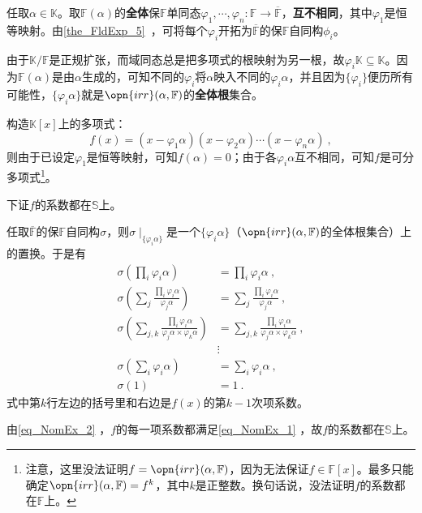 任取$\alpha\in\mathbb{K}$。取$\mathbb{F}(\alpha)$的\textbf{全体}保$\mathbb{F}$单同态$\varphi_1, \cdots, \varphi_n:\mathbb{F}\to\overline{\mathbb{F}}$，\textbf{互不相同}，其中$\varphi_1$是恒等映射。由\autoref{the_FldExp_5}~，可将每个$\varphi_i$开拓为$\overline{\mathbb{F}}$的保$\mathbb{F}$自同构$\phi_i$。

由于$\mathbb{K}/\mathbb{F}$是正规扩张，而域同态总是把多项式的根映射为另一根，故$\varphi_i\mathbb{K}\subseteq\mathbb{K}$。因为$\mathbb{F}(\alpha)$是由$\alpha$生成的，可知不同的$\varphi_i$将$\alpha$映入不同的$\varphi_i\alpha$，并且因为$\{\varphi_i\}$便历所有可能性，$\{\varphi_i\alpha\}$就是$\opn{irr}(\alpha, \mathbb{F})$的\textbf{全体根}集合。

构造$\mathbb{K}[x]$上的多项式：
\begin{equation}
f(x) = (x-\varphi_1\alpha)(x-\varphi_2\alpha)\cdots(x-\varphi_n\alpha)~,
\end{equation}
则由于已设定$\varphi_1$是恒等映射，可知$f(\alpha)=0$；由于各$\varphi_i\alpha$互不相同，可知$f$是可分多项式\footnote{注意，这里没法证明$f=\opn{irr}(\alpha, \mathbb{F})$，因为无法保证$f\in\mathbb{F}[x]$。最多只能确定$\opn{irr}(\alpha, \mathbb{F})=f^k$，其中$k$是正整数。换句话说，没法证明$f$的系数都在$\mathbb{F}$上。}。

下证$f$的系数都在$\mathbb{S}$上。

任取$\overline{\mathbb{F}}$的保$\mathbb{F}$自同构$\sigma$，则$\sigma\mid_{\{\varphi_i\alpha\}}$是一个$\{\varphi_i\alpha\}$（$\opn{irr}(\alpha, \mathbb{F})$的全体根集合）上的置换。于是有
\begin{equation}\label{eq_NomEx_2}
\begin{aligned}
\sigma(\prod_i \varphi_i\alpha) &= \prod_i \varphi_i\alpha~,\\
\sigma(\sum_{j}\frac{\prod_i \varphi_i\alpha}{\varphi_j\alpha}) &= \sum_{j}\frac{\prod_i \varphi_i\alpha}{\varphi_j\alpha}~,\\
\sigma(\sum_{j, k}\frac{\prod_i \varphi_i\alpha}{\varphi_j\alpha\times\varphi_k\alpha}) &= \sum_{j, k}\frac{\prod_i \varphi_i\alpha}{\varphi_j\alpha\times\varphi_k\alpha}~,\\
&\vdots\\
\sigma(\sum_i\varphi_i\alpha) &= \sum_i\varphi_i\alpha~,\\
\sigma(1) &= 1~.
\end{aligned}
\end{equation}
式中第$k$行左边的括号里和右边是$f(x)$的第$k-1$次项系数。

由\autoref{eq_NomEx_2} ，$f$的每一项系数都满足\autoref{eq_NomEx_1} ，故$f$的系数都在$\mathbb{S}$上。

